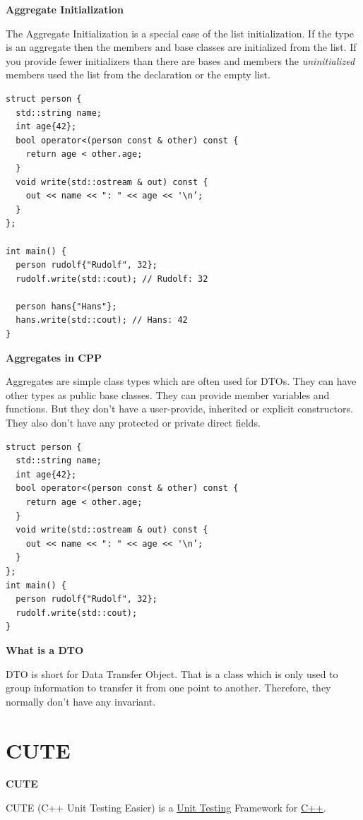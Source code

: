 \documentclass[11pt,twoside,landscape]{article}
\begin{document}
\begin{multicols}{3}
\textbf{Aggregate Initialization}

The Aggregate Initialization is a special case of the list initialization.
If the type is an aggregate then the members and base classes are initialized from the list.
If you provide fewer initializers than there are bases and members the \emph{uninitialized} members used the list from the declaration or the empty list.

\lstset{language=c++,label= ,caption= ,captionpos=b,numbers=none}
\begin{lstlisting}
struct person {
  std::string name;
  int age{42};
  bool operator<(person const & other) const {
    return age < other.age;
  }
  void write(std::ostream & out) const {
    out << name << ": " << age << '\n’;
  }
};

int main() {
  person rudolf{"Rudolf", 32};
  rudolf.write(std::cout); // Rudolf: 32

  person hans{"Hans"};
  hans.write(std::cout); // Hans: 42
}
\end{lstlisting}

\textbf{Aggregates in CPP}

Aggregates are simple class types which are often used for DTOs.
They can have other types as public base classes.
They can provide member variables and functions.
But they don't have a user-provide, inherited or explicit constructors.
They also don't have any protected or private direct fields.


\lstset{language=c++,label= ,caption= ,captionpos=b,numbers=none}
\begin{lstlisting}
struct person {
  std::string name;
  int age{42};
  bool operator<(person const & other) const {
    return age < other.age;
  }
  void write(std::ostream & out) const {
    out << name << ": " << age << '\n’;
  }
};
int main() {
  person rudolf{"Rudolf", 32};
  rudolf.write(std::cout);
}
\end{lstlisting}

\textbf{What is a DTO}

DTO is short for Data Transfer Object.
That is a class which is only used to group information to transfer it from one point to another.
Therefore, they normally don't have any invariant.
\section{CUTE}
\label{sec:org4d275b1}
\textbf{CUTE}

CUTE (C++ Unit Testing Easier) is a \href{../../../roam/20210920103754-unit_testing.org}{Unit Testing} Framework for \href{../../../roam/20210920103243-c.org}{C++}. 


\end{multicols}
\end{document}
